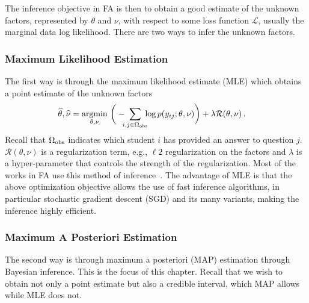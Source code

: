 The inference objective in FA is then to obtain a good estimate of the unknown
factors, represented by $\theta$ and $\nu$, with respect to some loss function
$\mathcal{L}$, usually the marginal data log likelihood. There are two ways to
infer the unknown factors.

\subsubsection{Maximum Likelihood Estimation}
The first way is through the maximum likelihood estimate (MLE) which obtains a
point estimate of the unknown factors
\begin{align}
    \widehat{\theta},\widehat{\nu}
     & = \underset{\theta,\nu}{\rm argmin}\,\,\bigg(-\hspace{-5pt}\sum_{i,j\in\Omega_{\rm obs}}\hspace{-5pt} {\rm log}\,p(y_{ij} ; \theta,\nu)\bigg) +  \lambda \mathcal{R}(\theta,\nu) \,.\label{eq:mle}
\end{align}
Recall that $\Omega_{\rm obs}$ indicates which student $i$ has provided an answer to question $j$. $\mathcal{R}(\theta,\nu)$ is a regularization term, e.g., $\ell2$ regularization on the factors and $\lambda$ is a hyper-parameter that controls the strength of the regularization. Most of the works in FA use this method of inference~\cite{LFA,PFA,chi2011instructional,vie2019knowledge,das3h,lindsey2014improving,mozer2016predicting}. The advantage of MLE is that the above optimization objective allows the use of fast inference algorithms, in particular stochastic gradient descent (SGD) and its many variants, making the inference highly efficient.

\subsubsection{Maximum A Posteriori Estimation}
\label{sec:bayes}
The second way is through maximum a posteriori (MAP) estimation through Bayesian inference. This is the focus of this chapter. Recall that we wish to obtain not only a point estimate but also a credible interval, which MAP allows while MLE does not.

